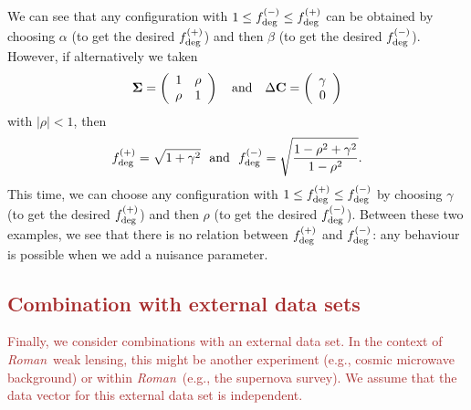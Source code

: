 \documentclass[usenatbib]{mnras}
\newcommand{\wfirst}{{\slshape Roman}}
\newcommand{\changetext}[1]{\textcolor{brown}{#1}}
\begin{document}
{We can see that any configuration with $1 \le f_{\rm deg}^{(-)} \le f_{\rm deg}^{(+)}$ can be obtained by choosing $\alpha$ (to get the desired $f_{\rm deg}^{(+)}$) and then $\beta$ (to get the desired $f_{\rm deg}^{(-)}$). However, if alternatively we taken
\begin{equation}
{\boldsymbol\Sigma} = \left( \begin{array}{cc} 1 & \rho \\ \rho & 1 \end{array} \right)
~~~{\rm and}~~~
\Delta{\bf C} = \left( \begin{array}c \gamma \\ 0 \end{array} \right)
\end{equation}
with $|\rho|<1$, then
\begin{equation}
f_{\rm deg}^{(+)} = \sqrt{1+\gamma^2} ~~{\rm and}~~ f_{\rm deg}^{(-)} = \sqrt{\frac{1-\rho^2+\gamma^2}{1-\rho^2}}.
\end{equation}
This time, we can choose any configuration with $1\le f_{\rm deg}^{(+)}\le f_{\rm deg}^{(-)}$ by choosing $\gamma$ (to get the desired $f_{\rm deg}^{(+)}$) and then $\rho$ (to get the desired $f_{\rm deg}^{(-)}$). Between these two examples, we see that there is no relation between $f_{\rm deg}^{(+)}$ and $f_{\rm deg}^{(-)}$: any behaviour is possible when we add a nuisance parameter.}

\subsection{\changetext{Combination with external data sets}}

\changetext{Finally, we consider combinations with an external data set. In the context of \wfirst\ weak lensing, this might be another experiment (e.g., cosmic microwave background) or within \wfirst\ (e.g., the supernova survey). We assume that the data vector for this external data set is independent.}
\end{document}
